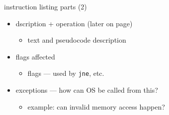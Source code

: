 \begin{frame}{instruction listing parts (2)}
    \begin{itemize}
    \item dscription + operation (later on page)
        \begin{itemize}
        \item text and pseudocode description
        \end{itemize}
    \item flags affected
        \begin{itemize}
        \item flags --- used by {\tt jne}, etc.
        \end{itemize}
    \item exceptions --- how can OS be called from this?
        \begin{itemize}
        \item example: can invalid memory access happen?
        \end{itemize}
    \end{itemize}
\end{frame}
